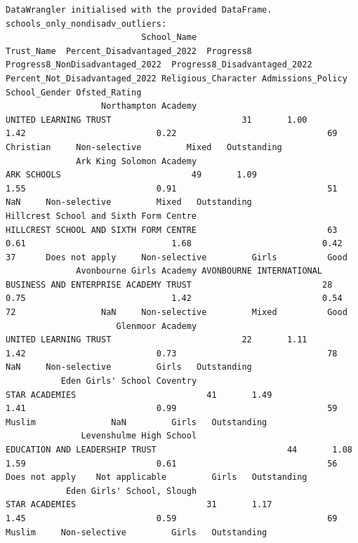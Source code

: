 \documentclass[
  letterpaper,
  DIV=11,
  numbers=noendperiod]{scrartcl}
\begin{document}
\begin{verbatim}
DataWrangler initialised with the provided DataFrame.
schools_only_nondisadv_outliers:
                           School_Name                                                     Trust_Name  Percent_Disadvantaged_2022  Progress8  Progress8_NonDisadvantaged_2022  Progress8_Disadvantaged_2022  Percent_Not_Disadvantaged_2022 Religious_Character Admissions_Policy School_Gender Ofsted_Rating
                   Northampton Academy                                          UNITED LEARNING TRUST                          31       1.00                             1.42                          0.22                              69           Christian     Non-selective         Mixed   Outstanding
              Ark King Solomon Academy                                                    ARK SCHOOLS                          49       1.09                             1.55                          0.91                              51                 NaN     Non-selective         Mixed   Outstanding
Hillcrest School and Sixth Form Centre                         HILLCREST SCHOOL AND SIXTH FORM CENTRE                          63       0.61                             1.68                          0.42                              37      Does not apply     Non-selective         Girls          Good
              Avonbourne Girls Academy AVONBOURNE INTERNATIONAL BUSINESS AND ENTERPRISE ACADEMY TRUST                          28       0.75                             1.42                          0.54                              72                 NaN     Non-selective         Mixed          Good
                      Glenmoor Academy                                          UNITED LEARNING TRUST                          22       1.11                             1.42                          0.73                              78                 NaN     Non-selective         Girls   Outstanding
           Eden Girls' School Coventry                                                 STAR ACADEMIES                          41       1.49                             1.41                          0.99                              59              Muslim               NaN         Girls   Outstanding
               Levenshulme High School                                 EDUCATION AND LEADERSHIP TRUST                          44       1.08                             1.59                          0.61                              56      Does not apply    Not applicable         Girls   Outstanding
            Eden Girls' School, Slough                                                 STAR ACADEMIES                          31       1.17                             1.45                          0.59                              69              Muslim     Non-selective         Girls   Outstanding 
\end{verbatim}
\end{document}
